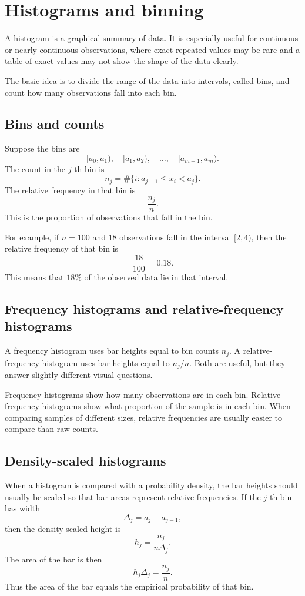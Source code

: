 \section{Histograms and binning}

A histogram is a graphical summary of data. It is especially useful for
continuous or nearly continuous observations, where exact repeated values may be
rare and a table of exact values may not show the shape of the data clearly.

The basic idea is to divide the range of the data into intervals, called bins,
and count how many observations fall into each bin.

\subsection*{Bins and counts}

Suppose the bins are
\[
[a_0,a_1),\quad [a_1,a_2),\quad \ldots,\quad [a_{m-1},a_m).
\]
The count in the \(j\)-th bin is
\[
n_j=\#\{i:a_{j-1}\leq x_i<a_j\}.
\]
The relative frequency in that bin is
\[
\frac{n_j}{n}.
\]
This is the proportion of observations that fall in the bin.

For example, if \(n=100\) and \(18\) observations fall in the interval
\([2,4)\), then the relative frequency of that bin is
\[
\frac{18}{100}=0.18.
\]
This means that \(18\%\) of the observed data lie in that interval.

\subsection*{Frequency histograms and relative-frequency histograms}

A frequency histogram uses bar heights equal to bin counts \(n_j\). A
relative-frequency histogram uses bar heights equal to \(n_j/n\). Both are useful,
but they answer slightly different visual questions.

Frequency histograms show how many observations are in each bin. Relative-
frequency histograms show what proportion of the sample is in each bin. When
comparing samples of different sizes, relative frequencies are usually easier to
compare than raw counts.

\subsection*{Density-scaled histograms}

When a histogram is compared with a probability density, the bar heights should
usually be scaled so that bar areas represent relative frequencies. If the
\(j\)-th bin has width
\[
\Delta_j=a_j-a_{j-1},
\]
then the density-scaled height is
\[
h_j=\frac{n_j}{n\Delta_j}.
\]
The area of the bar is then
\[
h_j\Delta_j=\frac{n_j}{n}.
\]
Thus the area of the bar equals the empirical probability of that bin.

